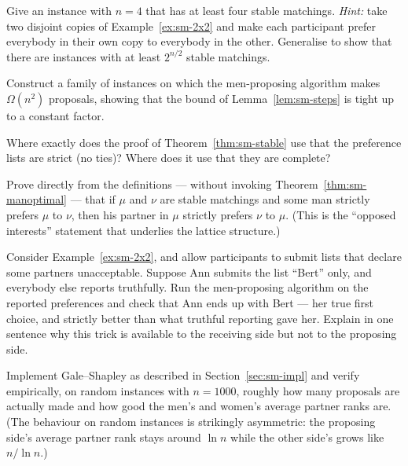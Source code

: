 \begin{exercise}
Give an instance with $n = 4$ that has at least four stable matchings.
\emph{Hint:} take two disjoint copies of Example~\ref{ex:sm-2x2} and make each
participant prefer everybody in their own copy to everybody in the other.
Generalise to show that there are instances with at least $2^{n/2}$ stable
matchings.
\end{exercise}

\begin{exercise}
Construct a family of instances on which the men-proposing algorithm makes
$\Omega(n^2)$ proposals, showing that the bound of Lemma~\ref{lem:sm-steps} is
tight up to a constant factor.
\end{exercise}

\begin{exercise}
Where exactly does the proof of Theorem~\ref{thm:sm-stable} use that the
preference lists are strict (no ties)? Where does it use that they are
complete?
\end{exercise}

\begin{exercise}
Prove directly from the definitions --- without invoking
Theorem~\ref{thm:sm-manoptimal} --- that if $\mu$ and $\nu$ are stable matchings
and some man strictly prefers $\mu$ to $\nu$, then his partner in $\mu$
strictly prefers $\nu$ to $\mu$. (This is the ``opposed interests'' statement
that underlies the lattice structure.)
\end{exercise}

\begin{exercise}\label{exc:sm-lying}
Consider Example~\ref{ex:sm-2x2}, and allow participants to submit lists that
declare some partners unacceptable. Suppose Ann submits the list ``Bert''
only, and everybody else reports truthfully. Run the men-proposing algorithm
on the reported preferences and check that Ann ends up with Bert --- her true
first choice, and strictly better than what truthful reporting gave her.
Explain in one sentence why this trick is available to the receiving side but
not to the proposing side.
\end{exercise}

\begin{exercise}
Implement Gale--Shapley as described in Section~\ref{sec:sm-impl} and verify
empirically, on random instances with $n = 1000$, roughly how many proposals
are actually made and how good the men's and women's average partner ranks
are. (The behaviour on random instances is strikingly asymmetric: the
proposing side's average partner rank stays around $\ln n$ while the other
side's grows like $n/\ln n$.)
\end{exercise}


